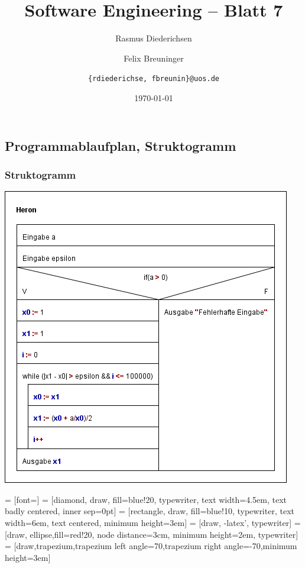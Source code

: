 \documentclass{scrartcl}
\title{\rmfamily Software Engineering -- Blatt 7}
\author{Rasmus Diederichsen \and Felix Breuninger\and 
   \texttt{\{rdiederichse, fbreunin\}@uos.de}
}
\date{\today}
\begin{document}
\selectfont
\maketitle

\setcounter{section}{7}
\setcounter{subsection}{0}

\subsection{Programmablaufplan, Struktogramm}

\subsubsection*{Struktogramm}

\begin{center}
   \includegraphics[scale=0.6]{Heron.png}
\end{center}

 = [font=\ttfamily]
 = [diamond, draw, fill=blue!20, typewriter,
                        text width=4.5em, text badly centered, inner sep=0pt]
    = [rectangle, draw, fill=blue!10, typewriter,
                        text width=6em, text centered, minimum height=3em]
     = [draw, -latex', typewriter]
    = [draw, ellipse,fill=red!20, node distance=3cm,
                        minimum height=2em, typewriter]
       = [draw,trapezium,trapezium left angle=70,trapezium right
angle=-70,minimum height=3em]
\end{document}
